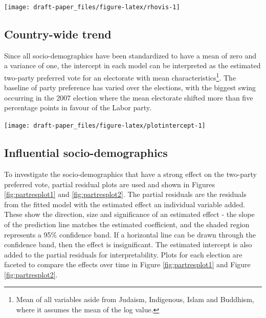 \documentclass[11pt,a4paper,]{article}
\let\origfigure\figure
\let\endorigfigure\endfigure
\renewenvironment{figure}[1][2] {
    \expandafter\origfigure\expandafter[H]
} {
    \endorigfigure
}
\begin{document}
\begin{figure}[h]

{\centering \texttt{[image: draft-paper\_files/figure-latex/rhovis-1]} 

}

\caption{Estimates of the spatial autoregressive parameter for each of the six elections, reported with their individual 95\% confidence intervals. Only in 2001 and 2016 is there a significant spatial component.}\label{fig:rhovis}
\end{figure}

\hypertarget{country-wide-trend}{%
\subsection{Country-wide trend}\label{country-wide-trend}}

Since all socio-demographics have been standardized to have a mean of zero and a variance of one, the intercept in each model can be interpreted as the estimated two-party preferred vote for an electorate with mean characteristics\footnote{Mean of all variables aside from Judaism, Indigenous, Islam and Buddhism, where it assumes the mean of the log value.}. The baseline of party preference has varied over the elections, with the biggest swing occurring in the 2007 election where the mean electorate shifted more than five percentage points in favour of the Labor party.

\begin{figure}[h]

{\centering \texttt{[image: draft-paper\_files/figure-latex/plotintercept-1]} 

}

\caption{Estimated intercept for each election, which represents the two-party preferred vote for an electorate with mean characteristics.}\label{fig:plotintercept}
\end{figure}

\hypertarget{influential-socio-demographics}{%
\subsection{Influential socio-demographics}\label{influential-socio-demographics}}

To investigate the socio-demographics that have a strong effect on the two-party preferred vote, partial residual plots are used and shown in Figures \ref{fig:partresplot1} and \ref{fig:partresplot2}. The partial residuals are the residuals from the fitted model with the estimated effect an individual variable added. These show the direction, size and significance of an estimated effect - the slope of the prediction line matches the estimated coefficient, and the shaded region represents a 95\% confidence band. If a horizontal line can be drawn through the confidence band, then the effect is insignificant. The estimated intercept is also added to the partial residuals for interpretability. Plots for each election are faceted to compare the effects over time in Figure \ref{fig:partresplot1} and Figure \ref{fig:partresplot2}.
\end{document}
